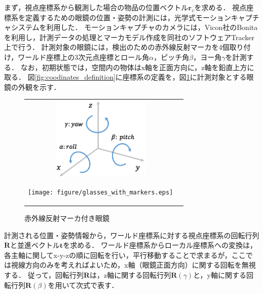\newpage
まず，視点座標系から観測した場合の物品の位置ベクトル$ \bm{r}_v $を求める．
視点座標系を定義するための眼鏡の位置・姿勢の計測には，光学式モーションキャプチャシステムを利用した．
モーションキャプチャのカメラには，Vicon社のBonitaを利用し，計測データの処理とマーカモデル作成を同社のソフトウェアTracker上で行う．
計測対象の眼鏡には，検出のための赤外線反射マーカを4個取り付け，ワールド座標上の3次元点座標とロール角$ \alpha $，ピッチ角$ \beta $，ヨー角$ \gamma $を計測する．
なお，初期状態では，空間内の物体はx軸を正面方向に，z軸を鉛直上方に取る．
図{\ref{fig:coodinates_definition}}に座標系の定義を，図{\ref{fig:glasses_with_markers}}に計測対象とする眼鏡の外観を示す．
%
\begin{figure}[htbp]
\begin{tabular}{cc}
%
  \begin{minipage}{0.5\textwidth}
    \begin{center}
      \includegraphics[height=40mm]{figure/coodinates_definition.eps}
      \vspace{-5mm}
      \caption{座標系定義}
      \label{fig:coodinates_definition}
    \end{center}
  \end{minipage}
%
  \begin{minipage}{0.5\textwidth}
    \begin{center}
      \texttt{[image: figure/glasses\_with\_markers.eps]}
      \vspace{-5mm}
      \caption{赤外線反射マーカ付き眼鏡}
      \label{fig:glasses_with_markers}
    \end{center}
  \end{minipage}
%
\end{tabular}
\end{figure}
%

計測される位置・姿勢情報から，ワールド座標系に対する視点座標系の回転行列$ \bm{R} $と並進ベクトル$ \bm{t} $を求める．
ワールド座標系からローカル座標系への変換は，各主軸に関してx-y-zの順に回転を行い，平行移動することで求まるが，ここでは視線方向のみを考えればよいため，x軸（眼鏡正面方向）に関する回転を無視する．
従って，回転行列$ \bm{R} $は，z軸に関する回転行列$ \bm{R}(\gamma) $と，y軸に関する回転行列$ \bm{R}(\beta) $を用いて次式で表す．

